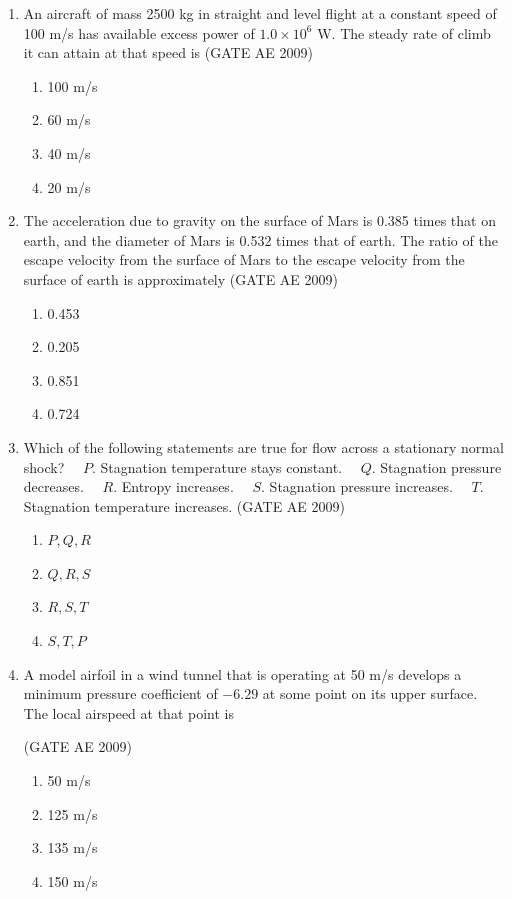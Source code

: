 \documentclass[journal,12pt,onecolumn]{IEEEtran}
\theoremstyle{remark}
\begin{document}
\begin{flushleft}
\begin{enumerate}
\item 
An aircraft of mass 2500 kg in straight and level flight at a constant speed of 100 m/s has available excess power of \(1.0 \times 10^6\) W. The steady rate of climb it can attain at that speed is  
\hfill(GATE AE 2009)
\begin{enumerate}
\item 100 m/s
\item 60 m/s
\item 40 m/s
\item 20 m/s
\end{enumerate}

\item 
The acceleration due to gravity on the surface of Mars is 0.385 times that on earth, and the diameter of Mars is 0.532 times that of earth. The ratio of the escape velocity from the surface of Mars to the escape velocity from the surface of earth is approximately  
\hfill(GATE AE 2009)
\begin{enumerate}
\item 0.453
\item 0.205
\item 0.851
\item 0.724
\end{enumerate}

\item 
Which of the following statements are true for flow across a stationary normal shock?  
\(\quad P.\) Stagnation temperature stays constant.  
\(\quad Q.\) Stagnation pressure decreases.  
\(\quad R.\) Entropy increases.  
\(\quad S.\) Stagnation pressure increases.  
\(\quad T.\) Stagnation temperature increases.  
\hfill(GATE AE 2009)
\begin{enumerate}
\item \(P, Q, R\)
\item \(Q, R, S\)
\item \(R, S, T\)
\item \(S, T, P\)
\end{enumerate}

\item 
A model airfoil in a wind tunnel that is operating at 50 m/s develops a minimum pressure coefficient of \(-6.29\) at some point on its upper surface. The local airspeed at that point is  

\hfill(GATE AE 2009)
\begin{enumerate}
\item 50 m/s
\item 125 m/s
\item 135 m/s
\item 150 m/s
\end{enumerate}


\end{enumerate}
\end{flushleft}
\end{document}

